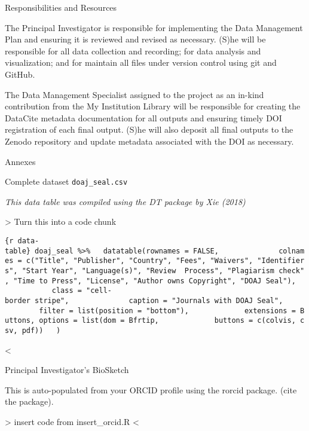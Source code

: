 \documentclass[ignorenonframetext,]{beamer}
\begin{document}
\begin{frame}

Responsibilities and Resources

The Principal Investigator is responsible for implementing the Data
Management Plan and ensuring it is reviewed and revised as necessary.
(S)he will be responsible for all data collection and recording; for
data analysis and visualization; and for maintain all files under
version control using git and GitHub.

The Data Management Specialist assigned to the project as an in-kind
contribution from the My Institution Library will be responsible for
creating the DataCite metadata documentation for all outputs and
ensuring timely DOI registration of each final output. (S)he will also
deposit all final outputs to the Zenodo repository and update metadata
associated with the DOI as necessary.

\end{frame}

\begin{frame}[fragile]{Annexes}

\begin{block}{Complete dataset \texttt{doaj\_seal.csv}}

\emph{This data table was compiled using the DT package by Xie (2018)}

\textbar{}\textbar{}\textgreater{} Turn this into a code chunk

\texttt{\{r\ data-table\}\ doaj\_seal\ \%\textgreater{}\%\ \ \ datatable(rownames\ =\ FALSE,\ \ \ \ \ \ \ \ \ \ \ \ \ \ colnames\ =\ c("Title",\ "Publisher",\ "Country",\ "Fees",\ "Waivers",\ "Identifiers",\ "Start\ Year",\ "Language(s)",\ "Review\ \ Process",\ "Plagiarism\ check",\ "Time\ to\ Press",\ "License",\ "Author\ owns\ Copyright",\ "DOAJ\ Seal"),\ \ \ \ \ \ \ \ \ \ \ \ \ class\ =\ "cell-border\ stripe",\ \ \ \ \ \ \ \ \ \ \ \ \ \ caption\ =\ "Journals\ with\ DOAJ\ Seal",\ \ \ \ \ \ \ \ \ \ \ \ \ filter\ =\ list(position\ =\ "bottom"),\ \ \ \ \ \ \ \ \ \ \ \ \ extensions\ =\ \textquotesingle{}Buttons\textquotesingle{},\ options\ =\ list(dom\ =\ \textquotesingle{}Bfrtip\textquotesingle{},\ \ \ \ \ \ \ \ \ \ \ \ \ buttons\ =\ c(\textquotesingle{}colvis\textquotesingle{},\ \textquotesingle{}csv\textquotesingle{},\ \textquotesingle{}pdf\textquotesingle{}))\ \ \ )}

\textless{}\textbar{}\textbar{}

\end{block}

\begin{block}{Principal Investigator's BioSketch}

This is auto-populated from your ORCID profile using the rorcid package.
(cite the package).

\textbar{}\textbar{}\textgreater{} insert code from insert\_orcid.R
\textless{}\textbar{}\textbar{}

\end{block}

\end{frame}
\end{document}
